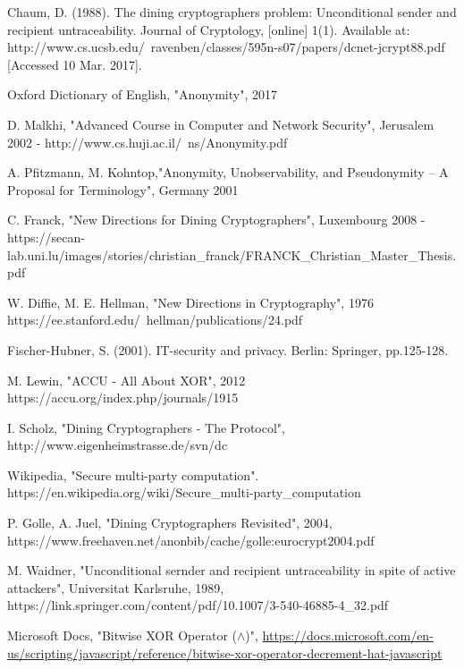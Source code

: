 \documentclass[12pt]{informatics-report}
\begin{document}


\begin{thebibliography}{99}

 Chaum, D. (1988). The dining cryptographers problem: Unconditional sender and recipient untraceability. Journal of Cryptology, [online] 1(1). Available at: http://www.cs.ucsb.edu/~ravenben/classes/595n-s07/papers/dcnet-jcrypt88.pdf [Accessed 10 Mar. 2017].

 Oxford Dictionary of English, "Anonymity", 2017

 D. Malkhi, "Advanced Course in Computer and Network Security", Jerusalem 2002 - http://www.cs.huji.ac.il/~ns/Anonymity.pdf

 A. Pfitzmann, M. Kohntop,"Anonymity, Unobservability, and Pseudonymity – A Proposal for Terminology", Germany 2001

 C. Franck, "New Directions for Dining Cryptographers", Luxembourg 2008 - https://secan-lab.uni.lu/images/stories/christian{\_}franck/FRANCK{\_}Christian{\_}Master{\_}Thesis.pdf

 W. Diffie, M. E. Hellman, "New Directions in Cryptography", 1976 https://ee.stanford.edu/~hellman/publications/24.pdf

 Fischer-Hubner, S. (2001). IT-security and privacy. Berlin: Springer, pp.125-128.

 M. Lewin, "ACCU - All About XOR", 2012 https://accu.org/index.php/journals/1915

 I. Scholz, "Dining Cryptographers - The Protocol", http://www.eigenheimstrasse.de/svn/dc

 Wikipedia, "Secure multi-party computation". https://en.wikipedia.org/wiki/Secure{\_}multi-party{\_}computation

 P. Golle, A. Juel, "Dining Cryptographers Revisited", 2004, https://www.freehaven.net/anonbib/cache/golle:eurocrypt2004.pdf 

 M. Waidner, "Unconditional sernder and recipient untraceability in spite of active attackers", Universitat Karlsruhe, 1989, https://link.springer.com/content/pdf/10.1007/3-540-46885-4{\_}32.pdf

 Microsoft Docs, "Bitwise XOR Operator ($\wedge$)", \url{https://docs.microsoft.com/en-us/scripting/javascript/reference/bitwise-xor-operator-decrement-hat-javascript}

\end{thebibliography}



%
%
\end{document}
